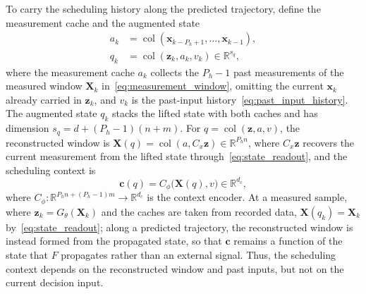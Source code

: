 \documentclass[journal]{IEEEtran}
\theoremstyle{plain}
\theoremstyle{definition}
\newcommand{\vx}{\mathbf{x}}
\newcommand{\vz}{\mathbf{z}}
\newcommand{\vc}{\mathbf{c}}
\newcommand{\mX}{\mathbf{X}}
\newcommand{\R}{\mathbb{R}}
\newcommand{\col}{\operatorname{col}}
\begin{document}
To carry the scheduling history along the predicted trajectory, define the measurement cache and the augmented state
\begin{equation}
\begin{aligned}
a_k&=\col(\vx_{k-P_h+1},\ldots,\vx_{k-1}),\\
q_k&=\col(\vz_k,a_k,v_k)\in\R^{s_q},
\end{aligned}
\label{eq:augmented_state}
\end{equation}
where the measurement cache $a_k$ collects the $P_h-1$ past measurements of the measured window $\mX_k$ in~\eqref{eq:measurement_window}, omitting the current $\vx_k$ already carried in $\vz_k$, and $v_k$ is the past-input history~\eqref{eq:past_input_history}. The augmented state $q_k$ stacks the lifted state with both caches and has dimension $s_q=d+(P_h-1)(n+m)$. For $q=\col(\vz,a,v)$, the reconstructed window is $\mX(q)=\col(a,C_x\vz)\in\R^{P_hn}$, where $C_x\vz$ recovers the current measurement from the lifted state through~\eqref{eq:state_readout}, and the scheduling context is
\begin{equation}
\vc(q)=C_\phi\bigl(\mX(q),v\bigr)\in\R^{d_c},
\label{eq:recursive_context}
\end{equation}
where $C_\phi:\R^{P_hn+(P_h-1)m}\to\R^{d_c}$ is the context encoder. At a measured sample, where $\vz_k=G_\theta(\mX_k)$ and the caches are taken from recorded data, $\mX(q_k)=\mX_k$ by~\eqref{eq:state_readout}; along a predicted trajectory, the reconstructed window is instead formed from the propagated state, so that $\vc$ remains a function of the state that $F$ propagates rather than an external signal. Thus, the scheduling context depends on the reconstructed window and past inputs, but not on the current decision input.
\end{document}
